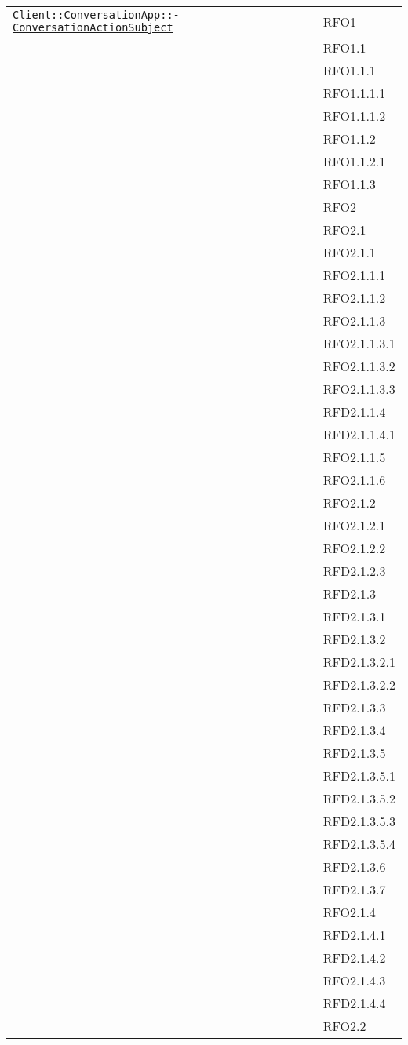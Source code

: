 \begin{longtable}{|>{\centering}m{10cm}|m{3cm}<{\centering}|}
\hyperref[Client::ConversationApp::ConversationActionSubject]{\texttt{Client::ConversationApp::-\linebreak ConversationActionSubject}} & RFO1\\
& RFO1.1\\
& RFO1.1.1\\
& RFO1.1.1.1\\
& RFO1.1.1.2\\
& RFO1.1.2\\
& RFO1.1.2.1\\
& RFO1.1.3\\
& RFO2\\
& RFO2.1\\
& RFO2.1.1\\
& RFO2.1.1.1\\
& RFO2.1.1.2\\
& RFO2.1.1.3\\
& RFO2.1.1.3.1\\
& RFO2.1.1.3.2\\
& RFO2.1.1.3.3\\
& RFD2.1.1.4\\
& RFD2.1.1.4.1\\
& RFO2.1.1.5\\
& RFO2.1.1.6\\
& RFO2.1.2\\
& RFO2.1.2.1\\
& RFO2.1.2.2\\
& RFD2.1.2.3\\
& RFD2.1.3\\
& RFD2.1.3.1\\
& RFD2.1.3.2\\
& RFD2.1.3.2.1\\
& RFD2.1.3.2.2\\
& RFD2.1.3.3\\
& RFD2.1.3.4\\
& RFD2.1.3.5\\
& RFD2.1.3.5.1\\
& RFD2.1.3.5.2\\
& RFD2.1.3.5.3\\
& RFD2.1.3.5.4\\
& RFD2.1.3.6\\
& RFD2.1.3.7\\
& RFO2.1.4\\
& RFD2.1.4.1\\
& RFD2.1.4.2\\
& RFO2.1.4.3\\
& RFD2.1.4.4\\
& RFO2.2\\

\end{longtable}

